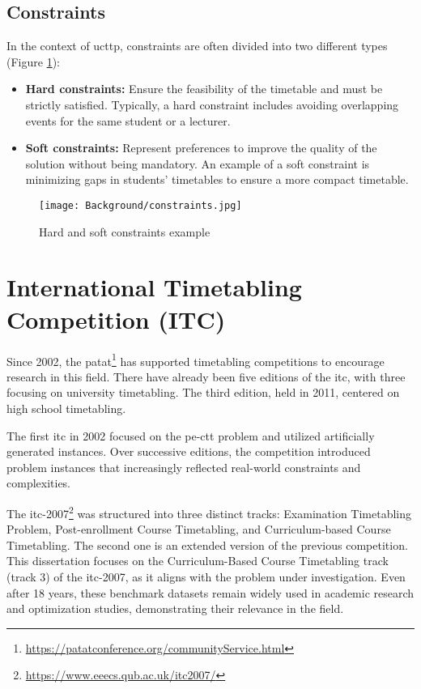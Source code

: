 \subsection{Constraints}
In the context of \ac{ucttp}, constraints are often divided into two different types (Figure \ref{fig:constraints}):
\begin{itemize}
\item \textbf{Hard constraints:} Ensure the feasibility of the timetable and must be strictly satisfied. Typically, a hard constraint includes avoiding overlapping events for the same student or a lecturer. 
\item \textbf{Soft constraints:} Represent preferences to improve the quality of the solution without being mandatory. An example of a soft constraint is minimizing gaps in students' timetables to ensure a more compact timetable.
\end{itemize}

\begin{figure}
      \centering
      \texttt{[image: Background/constraints.jpg]}
      \caption[Hard and soft constraints example]
      {Hard and soft constraints example}
      \label{fig:constraints}
\end{figure}

\section{International Timetabling Competition (ITC)}

Since 2002, the \ac{patat}\footnote{\url{https://patatconference.org/communityService.html}} has supported timetabling competitions to encourage research in this field. There have already been five editions of the \ac{itc}, with three focusing on university timetabling. The third edition, held in 2011, centered on high school timetabling.

The first \ac{itc} in 2002 focused on the \ac{pe-ctt} problem and utilized artificially generated instances. Over successive editions, the competition introduced problem instances that increasingly reflected real-world constraints and complexities.

The \ac{itc-2007}\footnote{\url{https://www.eeecs.qub.ac.uk/itc2007/}} was structured into three distinct tracks: Examination Timetabling Problem, Post-enrollment Course Timetabling, and Curriculum-based Course Timetabling. The second one is an extended version of the previous competition. This dissertation focuses on the Curriculum-Based Course Timetabling track (track 3) of the \ac{itc-2007}, as it aligns with the problem under investigation. Even after 18 years, these benchmark datasets remain widely used in academic research and optimization studies, demonstrating their relevance in the field.

